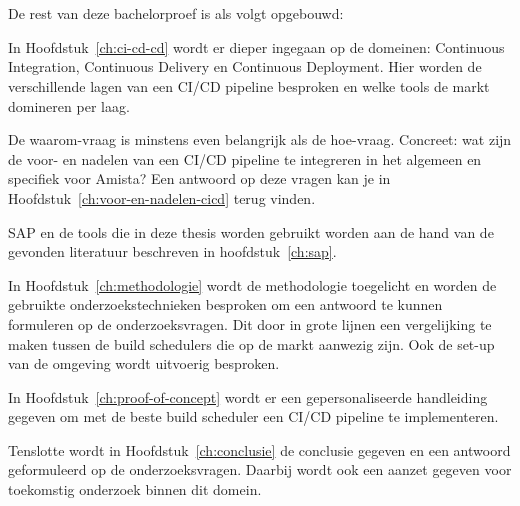 \section{}
\label{sec:opzet-bachelorproef}


De rest van deze bachelorproef is als volgt opgebouwd:

In Hoofdstuk~\ref{ch:ci-cd-cd} wordt er dieper ingegaan op de domeinen: Continuous Integration, Continuous Delivery en Continuous Deployment. Hier worden de verschillende lagen van een CI/CD pipeline besproken en welke tools de markt domineren per laag.

De waarom-vraag is minstens even belangrijk als de hoe-vraag. Concreet: wat zijn de voor- en nadelen van een CI/CD pipeline te integreren in het algemeen en specifiek voor Amista? Een antwoord op deze vragen kan je in Hoofdstuk~\ref{ch:voor-en-nadelen-cicd} terug vinden.

SAP en de tools die in deze thesis worden gebruikt worden aan de hand van de gevonden literatuur beschreven in hoofdstuk~\ref{ch:sap}.

In Hoofdstuk~\ref{ch:methodologie} wordt de methodologie toegelicht en worden de gebruikte onderzoekstechnieken besproken om een antwoord te kunnen formuleren op de onderzoeksvragen. Dit door in grote lijnen een vergelijking te maken tussen de build schedulers die op de markt aanwezig zijn. Ook de set-up van de omgeving wordt uitvoerig besproken.

In Hoofdstuk~\ref{ch:proof-of-concept} wordt er een gepersonaliseerde handleiding gegeven om met de beste build scheduler een CI/CD pipeline te implementeren.

Tenslotte wordt in Hoofdstuk~\ref{ch:conclusie} de conclusie gegeven en een antwoord geformuleerd op de onderzoeksvragen. Daarbij wordt ook een aanzet gegeven voor toekomstig onderzoek binnen dit domein.